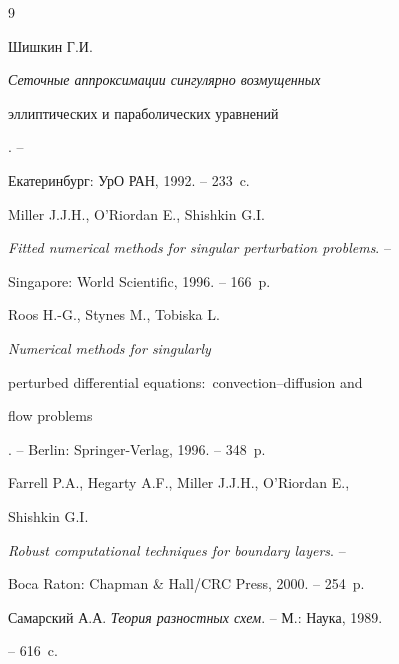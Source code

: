 \begin{thebibliography}{9}







Шишкин Г.И. {\em Сеточные аппроксимации сингулярно возмущенных


эллиптических и параболических уравнений}. --


Екатеринбург: УрО РАН, 1992. -- 233~c.




Miller J.J.H., O'Riordan E., Shishkin G.I.


{\em Fitted numerical methods for singular perturbation problems}. --


Singapore: World Scientific, 1996. -- 166~p.




Roos  H.-G.,  Stynes  M.,  Tobiska L.


{\em Numerical methods for singularly


perturbed differential equations\/${:}$ convection--diffusion and


flow problems}. -- Berlin: Springer-Verlag, 1996. -- 348~p.




Farrell P.A., Hegarty A.F., Miller J.J.H., O'Riordan E.,


Shishkin G.I.


{\em Robust computational techniques for boundary layers}. --


Boca Raton: Chapman \& Hall/CRC Press, 2000. -- 254~p.




Самарский А.А. {\em Теория разностных схем}. -- М.: Наука, 1989.


-- 616~c.





\end{thebibliography}





\vskip 2cm














\label{end}











